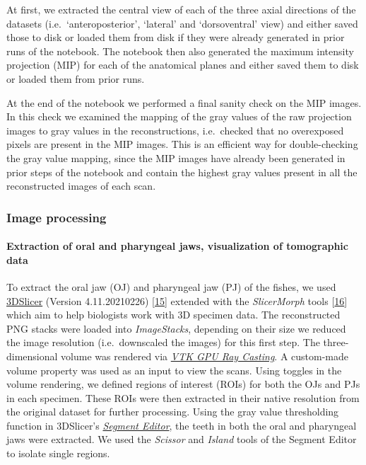 At first, we extracted the central view of each of the three axial directions of the datasets (i.e.~`anteroposterior', `lateral' and `dorsoventral' view) and either saved those to disk or loaded them from disk if they were already generated in prior runs of the notebook.
The notebook then also generated the maximum intensity projection (MIP) for each of the anatomical planes and either saved them to disk or loaded them from prior runs.

At the end of the notebook we performed a final sanity check on the MIP images.
In this check we examined the mapping of the gray values of the raw projection images to gray values in the reconstructions, i.e.~checked that no overexposed pixels are present in the MIP images.
This is an efficient way for double-checking the gray value mapping, since the MIP images have already been generated in prior steps of the notebook and contain the highest gray values present in all the reconstructed images of each scan.

\hypertarget{image-processing}{%
\subsubsection{Image processing}\label{image-processing}}

\hypertarget{extraction-of-oral-and-pharyngeal-jaws-visualization-of-tomographic-data}{%
\paragraph{Extraction of oral and pharyngeal jaws, visualization of tomographic data}\label{extraction-of-oral-and-pharyngeal-jaws-visualization-of-tomographic-data}}

To extract the oral jaw (OJ) and pharyngeal jaw (PJ) of the fishes, we used \href{https://www.slicer.org}{3DSlicer} (Version 4.11.20210226) {[}\protect\hyperlink{ref-OsCpHsJH}{15}{]} extended with the \emph{SlicerMorph} tools {[}\protect\hyperlink{ref-MwdN6kPV}{16}{]} which aim to help biologists work with 3D specimen data.
The reconstructed PNG stacks were loaded into \emph{ImageStacks}, depending on their size we reduced the image resolution (i.e.~downscaled the images) for this first step.
The three-dimensional volume was rendered via \href{https://slicer.readthedocs.io/en/latest/user_guide/modules/volumerendering.html}{\emph{VTK GPU Ray Casting}}.
A custom-made volume property was used as an input to view the scans.
Using toggles in the volume rendering, we defined regions of interest (ROIs) for both the OJs and PJs in each specimen.
These ROIs were then extracted in their native resolution from the original dataset for further processing.
Using the gray value thresholding function in 3DSlicer's \href{https://slicer.readthedocs.io/en/latest/user_guide/modules/segmenteditor.html}{\emph{Segment Editor}}, the teeth in both the oral and pharyngeal jaws were extracted.
We used the \emph{Scissor} and \emph{Island} tools of the Segment Editor to isolate single regions.

